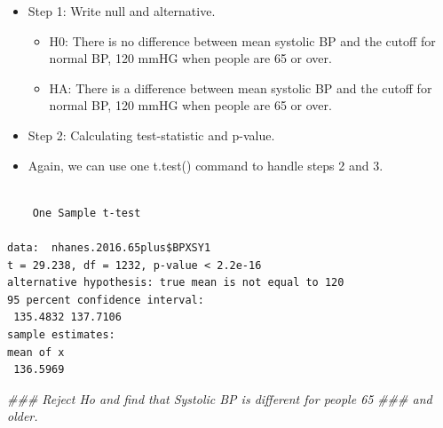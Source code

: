 \documentclass[
  letterpaper,
  DIV=11,
  numbers=noendperiod]{scrreprt}
\newenvironment{Shaded}{\begin{snugshade}}{\end{snugshade}}
\newcommand{\AttributeTok}[1]{\textcolor[rgb]{0.40,0.45,0.13}{#1}}
\newcommand{\DecValTok}[1]{\textcolor[rgb]{0.68,0.00,0.00}{#1}}
\newcommand{\DocumentationTok}[1]{\textcolor[rgb]{0.37,0.37,0.37}{\textit{#1}}}
\newcommand{\FloatTok}[1]{\textcolor[rgb]{0.68,0.00,0.00}{#1}}
\newcommand{\FunctionTok}[1]{\textcolor[rgb]{0.28,0.35,0.67}{#1}}
\newcommand{\NormalTok}[1]{\textcolor[rgb]{0.00,0.23,0.31}{#1}}
\newcommand{\SpecialCharTok}[1]{\textcolor[rgb]{0.37,0.37,0.37}{#1}}
\providecommand{\tightlist}{%
  \setlength{\itemsep}{0pt}\setlength{\parskip}{0pt}}\usepackage{longtable,booktabs,array}
\begin{document}
\begin{itemize}
\tightlist
\item
  Step 1: Write null and alternative.

  \begin{itemize}
  \tightlist
  \item
    H0: There is no difference between mean systolic BP and the cutoff
    for normal BP, 120 mmHG when people are 65 or over.
  \item
    HA: There is a difference between mean systolic BP and the cutoff
    for normal BP, 120 mmHG when people are 65 or over.
  \end{itemize}
\item
  Step 2: Calculating test-statistic and p-value.
\item
  Again, we can use one t.test() command to handle steps 2 and 3.
\end{itemize}

\begin{Shaded}
\end{Shaded}

\begin{verbatim}

    One Sample t-test

data:  nhanes.2016.65plus$BPXSY1
t = 29.238, df = 1232, p-value < 2.2e-16
alternative hypothesis: true mean is not equal to 120
95 percent confidence interval:
 135.4832 137.7106
sample estimates:
mean of x 
 136.5969 
\end{verbatim}

\begin{Shaded}
\begin{Highlighting}[]
\DocumentationTok{\#\#\# Reject Ho and find that Systolic BP is different for people 65}
\DocumentationTok{\#\#\# and older.}
\end{Highlighting}
\end{Shaded}
\end{document}
